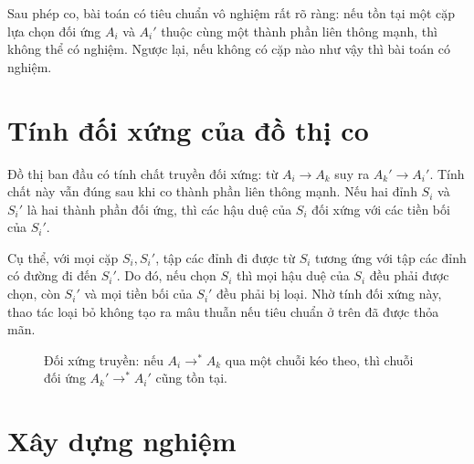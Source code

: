 \documentclass[11pt]{article}
\begin{document}
Sau phép co, bài toán có tiêu chuẩn vô nghiệm rất rõ ràng: nếu tồn tại
một cặp lựa chọn đối ứng $A_i$ và $A_i'$ thuộc cùng một thành phần liên
thông mạnh, thì không thể có nghiệm. Ngược lại, nếu không có cặp nào
như vậy thì bài toán có nghiệm.

\section{Tính đối xứng của đồ thị co}

Đồ thị ban đầu có tính chất truyền đối xứng: từ $A_i \to A_k$ suy ra
$A_k' \to A_i'$. Tính chất này vẫn đúng sau khi co thành phần liên
thông mạnh. Nếu hai đỉnh $S_i$ và $S_i'$ là hai thành phần đối ứng, thì
các hậu duệ của $S_i$ đối xứng với các tiền bối của $S_i'$.

Cụ thể, với mọi cặp $S_i, S_i'$, tập các đỉnh đi được từ $S_i$ tương
ứng với tập các đỉnh có đường đi đến $S_i'$. Do đó, nếu chọn $S_i$ thì
mọi hậu duệ của $S_i$ đều phải được chọn, còn $S_i'$ và mọi tiền bối
của $S_i'$ đều phải bị loại. Nhờ tính đối xứng này, thao tác loại bỏ
không tạo ra mâu thuẫn nếu tiêu chuẩn ở trên đã được thỏa mãn.

\begin{figure}[ht]
\centering
{}
\caption{Đối xứng truyền: nếu \(A_i\to^* A_k\) qua một chuỗi kéo theo, thì chuỗi đối ứng \(A_k'\to^* A_i'\) cũng tồn tại.}
\end{figure}

\section{Xây dựng nghiệm}
\end{document}
